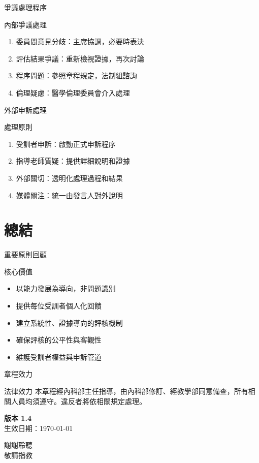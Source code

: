 \documentclass[aspectratio=169,12pt]{beamer}
\begin{document}
\begin{frame}{爭議處理程序}
\begin{block}{內部爭議處理}
\begin{enumerate}
    \item 委員間意見分歧：主席協調，必要時表決
    \item 評估結果爭議：重新檢視證據，再次討論
    \item 程序問題：參照章程規定，法制組諮詢
    \item 倫理疑慮：醫學倫理委員會介入處理
\end{enumerate}
\end{block}
\end{frame}

\begin{frame}{外部申訴處理}
\begin{block}{處理原則}
\begin{enumerate}
    \item 受訓者申訴：啟動正式申訴程序
    \item 指導老師質疑：提供詳細說明和證據
    \item 外部關切：透明化處理過程和結果
    \item 媒體關注：統一由發言人對外說明
\end{enumerate}
\end{block}
\end{frame}

\section{總結}

\begin{frame}{重要原則回顧}
\begin{block}{核心價值}
\begin{itemize}
    \item 以能力發展為導向，非問題識別
    \item 提供每位受訓者個人化回饋
    \item 建立系統性、證據導向的評核機制
    \item 確保評核的公平性與客觀性
    \item 維護受訓者權益與申訴管道
\end{itemize}
\end{block}
\end{frame}

\begin{frame}{章程效力}
\begin{alertblock}{法律效力}
本章程經內科部主任指導，由內科部修訂、經教學部同意備查，所有相關人員均須遵守。違反者將依相關規定處理。
\end{alertblock}

\vspace{1em}

\begin{center}
\textbf{版本 1.4}\\
生效日期：\today
\end{center}
\end{frame}

\begin{frame}[plain]
\begin{center}
\Huge 謝謝聆聽\\[1em]
\Large 敬請指教
\end{center}
\end{frame}
\end{document}
